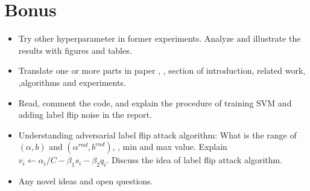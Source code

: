 \documentclass[12pt]{article}
\begin{document}
\section{Bonus}

\begin{itemize}    
    \item Try other hyperparameter in former experiments. Analyze and illustrate the results with figures and tables. 
    \item Translate one or more parts in paper \cite{biggio2011support}, \eg, section of introduction, related work, ,algorithms and experiments. 
    \item Read, comment the code, and explain the procedure of training SVM and adding label flip noise in the report. 
    \item Understanding adversarial label flip attack algorithm: What is the range of $(\alpha,b)$ and $(\alpha^{rnd},b^{rnd})$, \ie, min and max value. Explain $v_i \leftarrow \alpha_i /C -\beta_1 s_i -\beta_2 q_i $. Discuss the idea of label flip attack algorithm. 
    \item Any novel ideas and open questions. 
\end{itemize}

\end{document}
